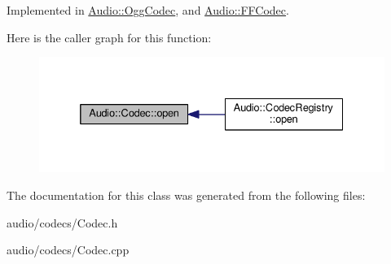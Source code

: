 Implemented in \hyperlink{classAudio_1_1OggCodec_a23ea17b563b23f37bd607932ccb9a06d}{Audio\+::\+Ogg\+Codec}, and \hyperlink{classAudio_1_1FFCodec_aa8e9f3e49b9bb3634302642805a3630a}{Audio\+::\+F\+F\+Codec}.



Here is the caller graph for this function\+:
\nopagebreak
\begin{figure}[H]
\begin{center}
\leavevmode
\includegraphics[width=332pt]{d2/d14/classAudio_1_1Codec_ace346d58a094f8c467cb152da061f82e_icgraph}
\end{center}
\end{figure}




The documentation for this class was generated from the following files\+:\begin{DoxyCompactItemize}
\item 
audio/codecs/Codec.\+h\item 
audio/codecs/Codec.\+cpp\end{DoxyCompactItemize}
